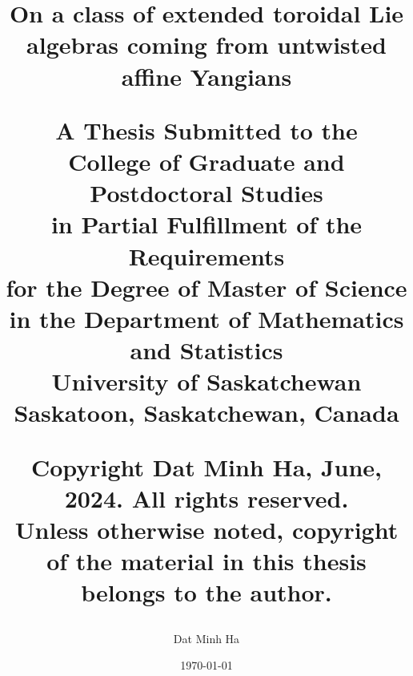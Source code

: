 \title{
    \texorpdfstring{\Huge On a class of extended toroidal Lie algebras coming from untwisted affine Yangians}


    \vfill

    \begin{centering}
        \normalsize A Thesis Submitted to the
        \\
        College of Graduate and Postdoctoral Studies
        \\
        in Partial Fulfillment of the Requirements
        \\
        for the Degree of Master of Science
        \\
        in the Department of Mathematics and Statistics
        \\
        University of Saskatchewan
        \\
        Saskatoon, Saskatchewan, Canada
    \end{centering}

    \vfill

    \begin{centering}
        \normalsize \textcopyright Copyright Dat Minh Ha, June, 2024. All rights reserved.
        \\
        Unless otherwise noted, copyright of the material in this thesis belongs to the author.
    \end{centering}

    \vfill

    \author{\normalsize Dat Minh Ha}
    \date{\normalsize \today}
}

\maketitle